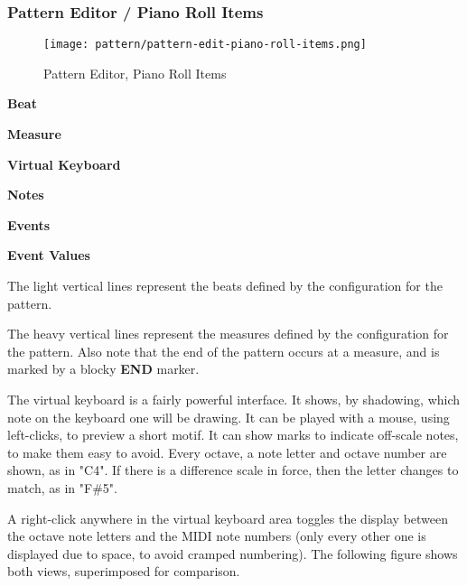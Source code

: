 \subsubsection{Pattern Editor / Piano Roll Items}
\label{subsubsec:seq64_pattern_editor_piano_roll_items}

\begin{figure}[H]
   \centering 
   \texttt{[image: pattern/pattern-edit-piano-roll-items.png]}
   \caption{Pattern Editor, Piano Roll Items}
   \label{fig:pattern_editor_piano_roll_items}
\end{figure}

   \begin{enumber}
      \item \textbf{Beat}
      \item \textbf{Measure}
      \item \textbf{Virtual Keyboard}
      \item \textbf{Notes}
      \item \textbf{Events}
      \item \textbf{Event Values}
   \end{enumber}

   \setcounter{ItemCounter}{0}      %

   The light vertical lines represent the beats defined by the configuration
   for the pattern.

   The heavy vertical lines represent the measures defined by the
   configuration for the pattern.
   Also note that the end of the pattern
   occurs at a measure, and is marked by a blocky \textbf{END} marker.

   The virtual keyboard is a fairly powerful interface.  It shows,
   by shadowing, which note on the keyboard one will be drawing. It can be
   played with a mouse, using left-clicks, to preview a short motif.
   It can show marks to indicate off-scale notes, to make them easy to
   avoid.  Every octave, a note letter and octave number are shown, as in
   "C4".  If there is a difference scale in force, then the letter changes to
   match, as in "F\#5".

   A right-click anywhere in the virtual keyboard area toggles the display
   between the octave note letters and the MIDI note numbers (only every other
   one is displayed due to space, to avoid cramped numbering).
   The following figure shows both views, superimposed for comparison.

